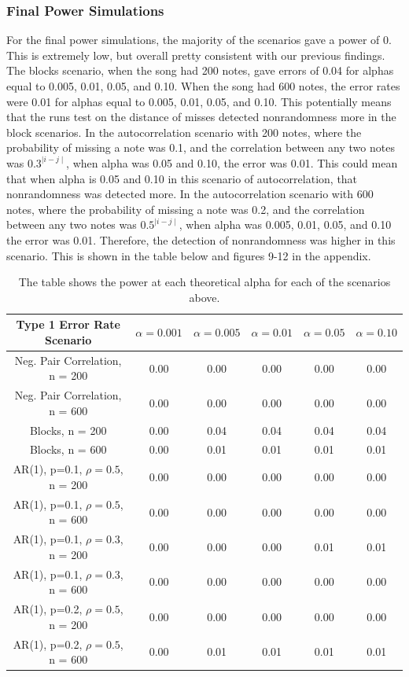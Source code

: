 \documentclass[12pt, letterpaper]{article}
\begin{document}
\subsubsection{Final Power Simulations}
For the final power simulations, the majority of the scenarios gave a power of 0. This is extremely low, but overall pretty consistent with our previous findings. The blocks scenario, when the song had 200 notes, gave errors of 0.04 for alphas equal to 0.005, 0.01, 0.05, and 0.10. When the song had 600 notes, the error rates were 0.01 for alphas equal to 0.005, 0.01, 0.05, and 0.10. This potentially means that the runs test on the distance of misses detected nonrandomness more in the block scenarios. In the autocorrelation scenario with 200 notes, where the probability of missing a note was 0.1, and the correlation between any two notes was $0.3^{\mid i-j \mid}$, when alpha was 0.05 and 0.10, the error was 0.01. This could mean that when alpha is 0.05 and 0.10 in this scenario of autocorrelation, that nonrandomness was detected more. In the autocorrelation scenario with 600 notes, where the probability of missing a note was 0.2, and the correlation between any two notes was $0.5^{\mid i-j \mid}$, when alpha was 0.005, 0.01, 0.05, and 0.10 the error was 0.01. Therefore, the detection of nonrandomness was higher in this scenario. This is shown in the table below and figures 9-12 in the appendix.
\begin{table}[h]
\begin{center}
\begin{tabular}{|c|c|c|c|c|c|}
\hline
\textbf{Type 1 Error Rate Scenario} & $\alpha = 0.001$ &  $\alpha = 0.005$ &  $\alpha = 0.01$ &  $\alpha = 0.05$ &  $\alpha = 0.10$ \\
\hline
Neg. Pair Correlation, n = 200 & 0.00 & 0.00 & 0.00 & 0.00 & 0.00 \\
\hline
Neg. Pair Correlation, n = 600 & 0.00 & 0.00 & 0.00 & 0.00 & 0.00 \\
\hline
Blocks, n = 200 & 0.00 & 0.04 & 0.04 & 0.04 & 0.04 \\
\hline
Blocks, n = 600 & 0.00 & 0.01 & 0.01 & 0.01 & 0.01 \\
\hline
AR(1), p=0.1, $\rho = 0.5$, n = 200 & 0.00 & 0.00 & 0.00 & 0.00 & 0.00 \\
\hline
AR(1), p=0.1, $\rho = 0.5$, n = 600 & 0.00 & 0.00 & 0.00 & 0.00 & 0.00 \\
\hline
AR(1), p=0.1, $\rho = 0.3$, n = 200 & 0.00 & 0.00 & 0.00 & 0.01 & 0.01 \\
\hline
AR(1), p=0.1, $\rho = 0.3$, n = 600 & 0.00 & 0.00 & 0.00 & 0.00 & 0.00 \\
\hline
AR(1), p=0.2, $\rho = 0.5$, n = 200 & 0.00 & 0.00 & 0.00 & 0.00 & 0.00 \\
\hline
AR(1), p=0.2, $\rho = 0.5$, n = 600 & 0.00 & 0.01 & 0.01 & 0.01 & 0.01 \\
\hline
\end{tabular}
\end{center}
\caption{The table shows the power at each theoretical alpha for each of the scenarios above.}
\label{fig: Power Simulations using Nonparametric Bootstrap}
\end{table}
\end{document}

